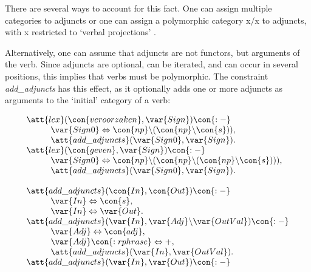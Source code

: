 \noindent There are several ways to account for this fact.  One can assign
multiple categories to adjuncts or one can assign a polymorphic category {\sc
x$/$x} to adjuncts, with {\sc x} restricted to `verbal projections'
\cite{bouma:88}.

Alternatively, one can assume that adjuncts are not functors, but arguments of
the verb.  Since adjuncts are optional, can be iterated, and can occur in
several positions, this implies that verbs must be polymorphic.  The constraint
{\em add\_adjuncts} has this effect, as it optionally adds one or more adjuncts
as arguments to the `initial' category of a verb:

\begin{equation}
\label{add-adj}
\begin{array}[t]{l}
\att{lex}(\con{veroorzaken},\var{Sign}) \con{:-} \\
\hspace{1cm}  
\var{Sign0} \Leftrightarrow \con{np}\backslash(\con{np}\backslash\con{s})), \\
\hspace{1cm}  
\att{add\_adjuncts}(\var{Sign0},\var{Sign}). \\
\att{lex}(\con{geven},\var{Sign}) \con{ :-} \\
\hspace{1cm}
\var{Sign0} \Leftrightarrow 
\con{np}\backslash(\con{np}\backslash(\con{np}\backslash\con{s}))), \\
\hspace{1cm}  
\att{add\_adjuncts}(\var{Sign0},\var{Sign}). \\
\\
\att{add\_adjuncts}(\con{In},\con{Out}) \con{:-} \\
\hspace{1cm}  
\var{In} \Leftrightarrow \con{s}, \\
\hspace{1cm}  
\var{In} \Leftrightarrow \var{Out}. \\
\att{add\_adjuncts}( \var{In},\var{Adj}\backslash \var{OutVal}) \con{ :-} \\
\hspace{1cm} \var{Adj} \Leftrightarrow \con{adj}, \\
\hspace{1cm} \var{Adj}\con{:rphrase} \Leftrightarrow +, \\
\hspace{1cm} \att{add\_adjuncts}(\var{In}, \var{OutVal}). \\
\att{add\_adjuncts}(\var{In},\var{Out}) \con{ :-} \\

\end{array}
\end{equation}
